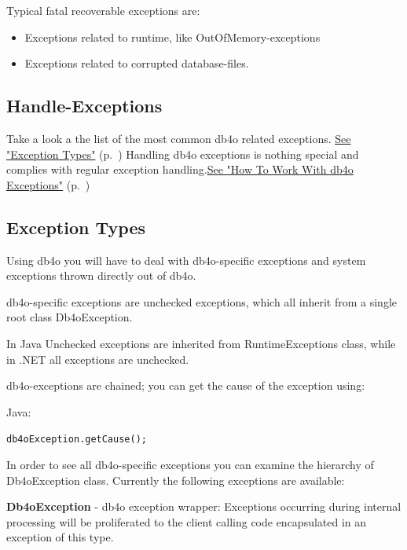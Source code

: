 Typical fatal recoverable exceptions are:

\begin{itemize}
\item Exceptions related to runtime, like OutOfMemory-exceptions
\item Exceptions related to corrupted database-files.
\end{itemize}

\subsection*{Handle-Exceptions}

Take a look a the list of the most common db4o related exceptions. \hyperref[ref:advanced-topics-exceptions-exception-types]{See "Exception Types"} (p.~\pageref{ref:advanced-topics-exceptions-exception-types}) Handling db4o exceptions is nothing special and complies with regular exception handling.\hyperref[ref:advanced-topics-exceptions-how-to-work-with-db4o-exceptions]{See "How To Work With db4o Exceptions"} (p.~\pageref{ref:advanced-topics-exceptions-how-to-work-with-db4o-exceptions})

\subsection{Exception Types}
\label{ref:advanced-topics-exceptions-exception-types}

Using db4o you will have to deal with db4o-specific exceptions and system exceptions thrown directly out of db4o.

db4o-specific exceptions are unchecked exceptions, which all inherit from a single root class Db4oException.

In Java Unchecked exceptions are inherited from RuntimeExceptions class, while in .NET all exceptions are unchecked.

db4o-exceptions are chained; you can get the cause of the exception using:

Java:

\texttt{db4oException.getCause();}

In order to see all db4o-specific exceptions you can examine the hierarchy of Db4oException class. Currently the following exceptions are available:

\textbf{Db4oException }- db4o exception wrapper: Exceptions occurring during internal processing will be proliferated to the client calling code encapsulated in an exception of this type.

